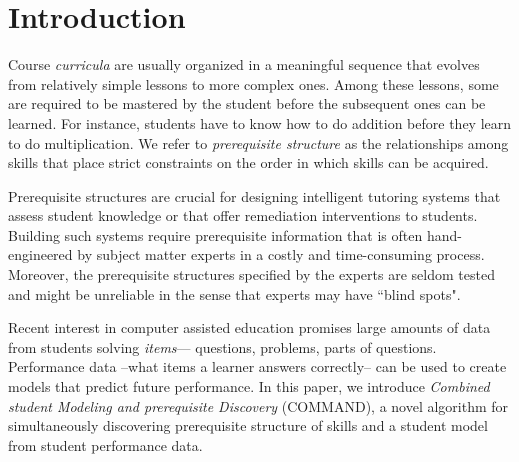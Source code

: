 \documentclass{edm_template}
\begin{document}
\section{Introduction}
\label{sec:introduction}
Course \textit{curricula} are usually organized in a meaningful sequence  that evolves from relatively simple lessons to more complex ones. 
Among these lessons, some are required to be mastered by the student  before the subsequent ones can be learned.
For instance, students have to know how to do addition before they learn to do multiplication.
We refer to \textit{prerequisite structure} as the relationships among skills that place strict constraints on the order in which  skills can be acquired. 

Prerequisite structures are crucial for designing intelligent tutoring systems that assess student knowledge or that offer remediation interventions to students.
Building such systems require prerequisite information that is often hand-engineered by subject matter experts in a costly and time-consuming process. 
Moreover, the prerequisite structures specified by the experts are seldom tested and might be unreliable in the sense that experts may have ``blind spots".


Recent interest in computer assisted education promises large amounts of data from students solving \textit{items}--- questions, problems, parts of questions.
Performance data --what items a learner answers correctly-- can be used to create  models that  predict future  performance.
In this paper, we introduce \emph{Combined student Modeling and prerequisite Discovery} (COMMAND), 
a novel algorithm for simultaneously discovering prerequisite structure of skills and a student model from student performance data.
\end{document}
